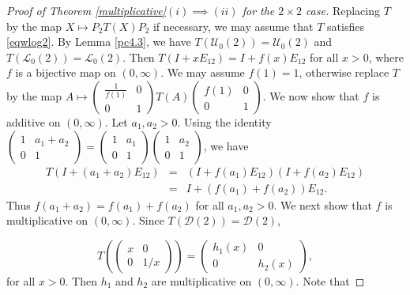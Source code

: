 \documentclass[11pt,reqno]{amsart}
\theoremstyle{plain}
\theoremstyle{definition}
\numberwithin{equation}{section}
\def\cD{\mathcal D}
\def\cU{\mathcal U}
\def\cL{\mathcal L}
\begin{document}
\begin{proof}[Proof of Theorem \ref{multiplicative}$(i)\implies (ii)$ for the $2\times2$ case]
Replacing $T$ by the map $X \mapsto P_2 T(X) P_2$ if necessary, we may assume that $T$ satisfies \eqref{eqwlog2}.	By Lemma \ref{pc4.3}, we have $ T(\cU_0(2)) = \cU_0(2)$ and $ T(\cL_0(2)) = \cL_0(2)$. Then $ T(I + xE_{12}) = I + f(x)E_{12}$ for all $x >0$, where $f$ is a bijective map on $(0,\infty)$. We may assume $f(1)=1$, otherwise replace $ T$ by the map $A \mapsto \begin{pmatrix}
		\frac{1}{ f(1)} & 0 \\ 0 & 1
	\end{pmatrix}T(A) \begin{pmatrix}
		f(1) & 0 \\ 0 & 1
	\end{pmatrix}$.  We now show that $f$ is additive on $(0,\infty)$. Let $a_1,a_2>0$. Using the identity $ \begin{pmatrix}
	1 & a_1+a_2 \\ 0 & 1
	\end{pmatrix}= \begin{pmatrix}
	1 & a_1 \\ 0 & 1
	\end{pmatrix}  \begin{pmatrix}
	1 & a_2 \\ 0 & 1
	\end{pmatrix}$, we have
	\begin{eqnarray*}
		T(I+(a_1+a_2)E_{12}) &=&(I+f(a_1)E_{12})(I+f(a_2)E_{12}) \\
		&=& I + (f(a_1)+f(a_2)) E_{12}.
	\end{eqnarray*}
	Thus $f(a_1+a_2)=f(a_1)+f(a_2)$ for all $a_1,a_2>0$.  We next show that $f$ is multiplicative on $(0,\infty)$.
	Since $T(\cD(2))=\cD(2)$,
	
	\[T\left(\begin{pmatrix}
		x & 0 \\ 0 & 1/x
	\end{pmatrix}\right)=\begin{pmatrix}
		h_1(x) & 0 \\ 0 & h_2(x)
	\end{pmatrix},\]
	for all $x>0$. Then $h_1$ and $h_2$ are multiplicative on $(0,\infty)$. Note that 
	

\end{proof}
\end{document}
